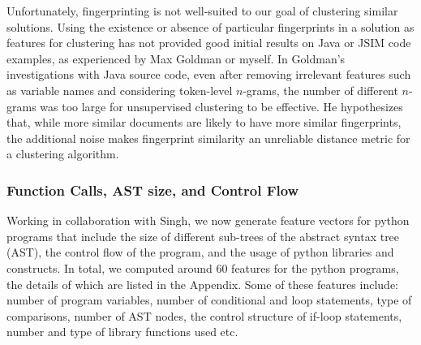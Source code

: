 \documentclass[12pt]{article}
\begin{document}
Unfortunately, fingerprinting is not well-suited to our goal of clustering similar solutions. Using the existence or absence of particular fingerprints in a solution as features for clustering has not provided good initial results on Java or JSIM code examples, as experienced by Max Goldman or myself. In Goldman's investigations with Java source code, even after removing irrelevant features such as variable names and considering token-level $n$-grams, the number of different $n$-grams was too large for unsupervised clustering to be effective. He hypothesizes that, while more similar documents are likely to have more similar fingerprints, the additional noise makes fingerprint similarity an unreliable distance metric for a clustering algorithm.



\subsubsection{Function Calls, AST size, and Control Flow}

Working in collaboration with Singh, we now generate feature vectors for python programs that include the size of different sub-trees of the abstract syntax tree (AST), the control flow of the program, and the usage of python libraries and constructs. In total, we computed around $60$ features for the python programs, the details of which are listed in the Appendix. Some of these features include: number of program variables, number of conditional and loop statements, type of comparisons, number of AST nodes, the control structure of if-loop statements, number and type of library functions used etc.
\end{document}
